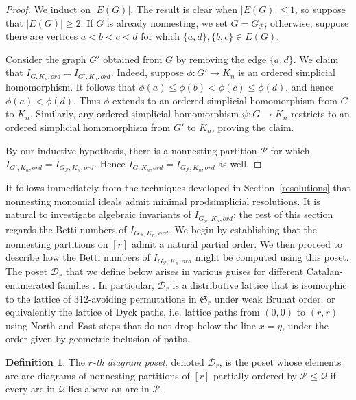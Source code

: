 \documentclass[11pt]{amsart}
\theoremstyle{definition}
\newtheorem{definition}[theorem]{Definition}
\numberwithin{equation}{section}
\theoremstyle{remark}
\numberwithin{equation}{section}
\begin{document}
\begin{proof}
We induct on $|E(G)|$.  The result is clear when $|E(G)| \leq 1$, so suppose that $|E(G)| \geq 2$.  
If $G$ is already nonnesting, we set $G = G_{\mathcal{P}}$; otherwise, suppose there are vertices $a<b<c<d$ for which $\{a,d\}, \{b,c\} \in E(G)$.

Consider the graph $G'$ obtained from $G$ by removing the edge $\{a,d\}$.  
We claim that $I_{G,K_n,ord} = I_{G',K_n,ord}$.  
Indeed, suppose $\phi: G' \rightarrow K_n$ is an ordered simplicial homomorphism.  
It follows that $\phi(a) \leq \phi(b) < \phi(c) \leq \phi(d)$, and hence $\phi(a) < \phi(d)$.  
Thus $\phi$ extends to an ordered simplicial homomorphism from $G$ to $K_n$.  
Similarly, any ordered simplicial homomorphism $\psi: G \rightarrow K_n$ restricts to an ordered simplicial homomorphism from $G'$ to $K_n$, proving the claim.

By our inductive hypothesis, there is a nonnesting partition $\mathcal{P}$ for which $I_{G',K_n,ord} = I_{G_{\mathcal{P}},K_n,ord}$.  
Hence $I_{G,K_n,ord} = I_{G_{\mathcal{P}},K_n,ord}$ as well.
\end{proof}

It follows immediately from the techniques developed in Section~\ref{resolutions} that nonnesting monomial ideals admit minimal prodsimplicial resolutions.
It is natural to investigate algebraic invariants of $I_{G_{\mathcal{P}},K_n,ord}$; the rest of this section regards the Betti numbers of $I_{G_{\mathcal{P}},K_n,ord}$.
We begin by establishing that the nonnesting partitions on $[r]$ admit a natural partial order.
We then proceed to describe how the Betti numbers of $I_{G_{\mathcal{P}},K_n,ord}$ might be computed using this poset.
The poset ${\mathcal{D}}_r$ that we define below arises in various guises for different Catalan-enumerated families \cite{BarcucciEtAl,CautisJackson,FerrariPinzani,SapounakisEtAl}.
In particular, ${\mathcal{D}}_r$ is a distributive lattice that is isomorphic to the lattice of $312$-avoiding permutations in $\mathfrak{S}_r$ under weak Bruhat order, or equivalently the lattice of Dyck paths, i.e. lattice paths from $(0,0)$ to $(r,r)$ using North and East steps that do not drop below the line $x=y$, under the order given by geometric inclusion of paths.

\begin{definition}
The \emph{$r$-th diagram poset}, denoted ${\mathcal{D}}_r$, is the poset whose elements are arc diagrams of nonnesting partitions of $[r]$ partially ordered by ${\mathcal{P}}\leq{\mathcal{Q}}$ if every arc in ${\mathcal{Q}}$ lies above an arc in ${\mathcal{P}}$.
\end{definition}
\end{document}
